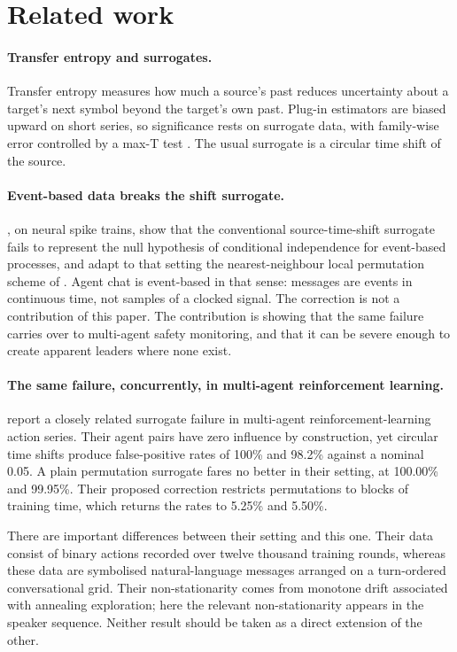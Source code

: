 \documentclass[10pt]{article}
\begin{document}
\section{Related work}

\paragraph{Transfer entropy and surrogates.} Transfer entropy \citep{schreiber2000} measures how much
a source's past reduces uncertainty about a target's next symbol beyond the target's own past.
Plug-in estimators are biased upward on short series, so significance rests on surrogate data, with
family-wise error controlled by a max-T test \citep{westfall1993}. The usual surrogate is a circular
time shift of the source.

\paragraph{Event-based data breaks the shift surrogate.} \citet{shorten2021}, on neural spike trains,
show that the conventional source-time-shift surrogate fails to represent the null hypothesis of
conditional independence for event-based processes, and adapt to that setting the nearest-neighbour
local permutation scheme of \citet{runge2018}. Agent chat is event-based in that sense: messages are
events in continuous time, not samples of a clocked signal. The correction is not a contribution of
this paper. The contribution is showing that the same failure carries over to multi-agent safety
monitoring, and that it can be severe enough to create apparent leaders where none exist.

\paragraph{The same failure, concurrently, in multi-agent reinforcement learning.}
\citet{papadopoulos2026} report a closely related surrogate failure in multi-agent
reinforcement-learning action series. Their agent pairs have zero influence by construction, yet
circular time shifts produce false-positive rates of 100\% and 98.2\% against a nominal 0.05. A
plain permutation surrogate fares no better in their setting, at 100.00\% and 99.95\%. Their
proposed correction restricts permutations to blocks of training time, which returns the rates to
5.25\% and 5.50\%.

There are important differences between their setting and this one. Their data consist of binary
actions recorded over twelve thousand training rounds, whereas these data are symbolised
natural-language messages arranged on a turn-ordered conversational grid. Their non-stationarity
comes from monotone drift associated with annealing exploration; here the relevant non-stationarity
appears in the speaker sequence. Neither result should be taken as a direct extension of the other.
\end{document}

